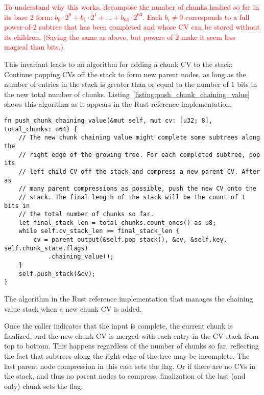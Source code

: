 \documentclass[11pt,notitlepage,a4paper]{article}
\newcommand{\flag}[1]{\texttt{\detokenize{#1}}\xspace}
\newcommand{\alert}[1]{\textcolor{red}{#1}}
\begin{document}
\alert{To understand why this works, decompose the number of chunks hashed so far in its base 2 form: $b_0\cdot 2^0 + b_1\cdot 2^1 + \dots + b_{63}\cdot 2^{63}$. Each $b_i \ne 0$ corresponds to a full power-of-2 subtree that has been completed and whose CV can be stored without its children. (Saying the same as above, but powers of 2 make it seem less magical than bits.)}

This invariant leads to an algorithm for adding a chunk CV to the stack:
Continue popping CVs off the stack to form new parent nodes, as long as the
number of entries in the stack is greater than or equal to the number of 1 bits
in the new total number of chunks.
Listing~\ref{listing:push_chunk_chaining_value} shows this algorithm as it
appears in the Rust reference implementation.

\begin{listing}[h]
\begin{verbatim}
fn push_chunk_chaining_value(&mut self, mut cv: [u32; 8], total_chunks: u64) {
    // The new chunk chaining value might complete some subtrees along the
    // right edge of the growing tree. For each completed subtree, pop its
    // left child CV off the stack and compress a new parent CV. After as
    // many parent compressions as possible, push the new CV onto the
    // stack. The final length of the stack will be the count of 1 bits in
    // the total number of chunks so far.
    let final_stack_len = total_chunks.count_ones() as u8;
    while self.cv_stack_len >= final_stack_len {
        cv = parent_output(&self.pop_stack(), &cv, &self.key, self.chunk_state.flags)
            .chaining_value();
    }
    self.push_stack(&cv);
}
\end{verbatim}
\caption{The algorithm in the Rust reference implementation that manages the
    chaining value stack when a new chunk CV is added.}
\label{listing:push_chunk_chaining_value}
\end{listing}

Once the caller indicates that the input is complete, the current chunk is
finalized, and the new chunk CV is merged with each entry in the CV stack from
top to bottom. This happens regardless of the number of chunks so far,
reflecting the fact that subtrees along the right edge of the tree may be
incomplete. The last parent node compression in this case sets the
\flag{ROOT} flag. Or if there are no CVs in the stack, and thus no parent
nodes to compress, finalization of the last (and only) chunk sets the
\flag{ROOT} flag.
\end{document}
